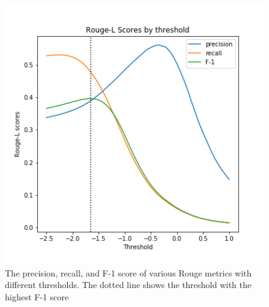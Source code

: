 \documentclass[11pt,a4paper]{article}
\begin{document}
\begin{figure}[t]
\begin{minipage}{.33\linewidth}
	\end{minipage}
	\begin{minipage}{.32\linewidth}
		\includegraphics[width=\linewidth]{plots/rouge-L.png}
	\end{minipage}
\caption{The precision, recall, and F-1 score of various Rouge metrics with different thresholds. The dotted line shows the threshold with the highest F-1 score}
\label{fig:threshold}
\end{figure}
\end{document}
